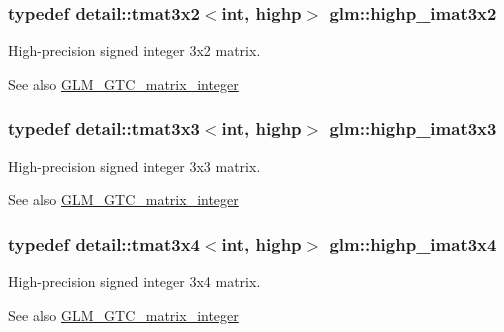\subsubsection[{\texorpdfstring{highp\+\_\+imat3x2}{highp_imat3x2}}]{\setlength{\rightskip}{0pt plus 5cm}typedef detail\+::tmat3x2$<$int, highp$>$ {\bf glm\+::highp\+\_\+imat3x2}}\hypertarget{group__gtc__matrix__integer_ga9780c1bc052a34c59dc95f4dd9e1a5c8}{}\label{group__gtc__matrix__integer_ga9780c1bc052a34c59dc95f4dd9e1a5c8}
High-\/precision signed integer 3x2 matrix. \begin{DoxySeeAlso}{See also}
\hyperlink{group__gtc__matrix__integer}{G\+L\+M\+\_\+\+G\+T\+C\+\_\+matrix\+\_\+integer} 
\end{DoxySeeAlso}
\subsubsection[{\texorpdfstring{highp\+\_\+imat3x3}{highp_imat3x3}}]{\setlength{\rightskip}{0pt plus 5cm}typedef detail\+::tmat3x3$<$int, highp$>$ {\bf glm\+::highp\+\_\+imat3x3}}\hypertarget{group__gtc__matrix__integer_ga4e7c11e49de5d71067b95a87c84308a8}{}\label{group__gtc__matrix__integer_ga4e7c11e49de5d71067b95a87c84308a8}
High-\/precision signed integer 3x3 matrix. \begin{DoxySeeAlso}{See also}
\hyperlink{group__gtc__matrix__integer}{G\+L\+M\+\_\+\+G\+T\+C\+\_\+matrix\+\_\+integer} 
\end{DoxySeeAlso}
\subsubsection[{\texorpdfstring{highp\+\_\+imat3x4}{highp_imat3x4}}]{\setlength{\rightskip}{0pt plus 5cm}typedef detail\+::tmat3x4$<$int, highp$>$ {\bf glm\+::highp\+\_\+imat3x4}}\hypertarget{group__gtc__matrix__integer_ga97ddf84f7ae0c5d4d3ecc18bb1d47449}{}\label{group__gtc__matrix__integer_ga97ddf84f7ae0c5d4d3ecc18bb1d47449}
High-\/precision signed integer 3x4 matrix. \begin{DoxySeeAlso}{See also}
\hyperlink{group__gtc__matrix__integer}{G\+L\+M\+\_\+\+G\+T\+C\+\_\+matrix\+\_\+integer} 
\end{DoxySeeAlso}
